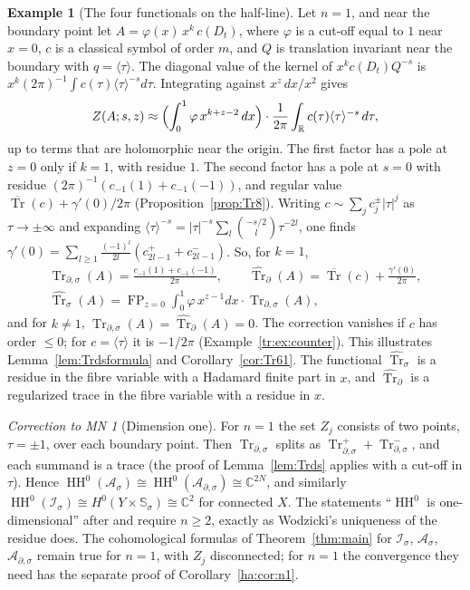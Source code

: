 \documentclass[11pt,oneside,reqno]{article}
\DeclareMathOperator{\HH}{HH}
\DeclareMathOperator{\Tr}{Tr}
\DeclareMathOperator{\FP}{FP}
\newcommand{\C}{\mathbb C}
\newcommand{\R}{\mathbb R}
\newcommand{\Is}{\mathcal I_\sigma}
\newcommand{\As}{\mathcal A_\sigma}
\newcommand{\Ads}{\mathcal A_{\partial,\sigma}}
\newcommand{\Trds}{\Tr_{\partial,\sigma}}
\newcommand{\hTrs}{\widehat{\Tr}_\sigma}
\newcommand{\hTrd}{\widehat{\Tr}_\partial}
\newcommand{\bTr}{\overline{\Tr}}
\newcommand{\Ssig}{\mathbb S_\sigma}
\theoremstyle{plain}
\theoremstyle{definition}
\newtheorem{example}[theorem]{Example}
\theoremstyle{remark}
\newtheorem{correction}[theorem]{Correction to MN}
\begin{document}
\begin{example}[The four functionals on the half-line]\label{ex:four}
Let \(n=1\), and near the boundary point let \(A=\varphi(x)\,x^k\,c(D_t)\),
where \(\varphi\) is a cut-off equal to \(1\) near \(x=0\), \(c\) is a
classical symbol of order \(m\), and \(Q\) is translation invariant near
the boundary with \(q=\langle\tau\rangle\). The diagonal value of the
kernel of \(x^kc(D_t)Q^{-s}\) is \(x^k(2\pi)^{-1}\int c(\tau)\langle\tau
\rangle^{-s}d\tau\). Integrating against \(x^z\,dx/x^2\) gives
\[
 Z(A;s,z)\approx\Bigl(\int_0^1\varphi\,x^{k+z-2}\,dx\Bigr)\cdot
 \frac1{2\pi}\int_{\R}c(\tau)\langle\tau\rangle^{-s}\,d\tau ,
\]
up to terms that are holomorphic near the origin. The first factor has a
pole at \(z=0\) only if \(k=1\), with residue \(1\). The second factor has
a pole at \(s=0\) with residue \((2\pi)^{-1}(c_{-1}(1)+c_{-1}(-1))\), and
regular value \(\bTr(c)+\gamma'(0)/2\pi\) (Proposition~\ref{prop:Tr8}).
Writing \(c\sim\sum_jc^\pm_j|\tau|^j\) as \(\tau\to\pm\infty\) and
expanding \(\langle\tau\rangle^{-s}=|\tau|^{-s}\sum_l\binom{-s/2}{l}
\tau^{-2l}\), one finds \(\gamma'(0)=\sum_{l\ge1}\frac{(-1)^l}{2l}
(c^+_{2l-1}+c^-_{2l-1})\). So, for \(k=1\),
\begin{gather*}
 \Trds(A)=\frac{c_{-1}(1)+c_{-1}(-1)}{2\pi},\qquad
 \hTrd(A)=\bTr(c)+\frac{\gamma'(0)}{2\pi},\\
 \hTrs(A)=\FP_{z=0}\!\int_0^1\varphi\,x^{z-1}dx\cdot\Trds(A),
\end{gather*}
and for \(k\ne1\), \(\Trds(A)=\hTrd(A)=0\). The correction vanishes if
\(c\) has order \(\le0\); for \(c=\langle\tau\rangle\) it is
\(-1/2\pi\) (Example~\ref{tr:ex:counter}). This illustrates
Lemma~\ref{lem:Trdsformula} and Corollary~\ref{cor:Tr61}. The functional
\(\hTrs\) is a residue in the fibre variable with a Hadamard finite part
in \(x\), and \(\hTrd\) is a regularized trace in the fibre variable with
a residue in \(x\).
\end{example}

\begin{correction}[Dimension one]\label{corr:n1}
For \(n=1\) the set \(Z_j\) consists of two points, \(\tau=\pm1\), over
each boundary point. Then \(\Trds\) splits as \(\Trds^++\Trds^-\), and
each summand is a trace (the proof of Lemma~\ref{lem:Trds} applies with a
cut-off in \(\tau\)). Hence \(\HH^0(\As)\cong\HH^0(\Ads)\cong\C^{2N}\),
and similarly \(\HH^0(\Is)\cong H^0(Y\times\Ssig)\cong\C^2\) for connected
\(X\). The statements ``\(\HH^0\) is one-dimensional'' after
\cite[(16)]{MN} and \cite[Lemma~12]{MN} require \(n\ge2\), exactly as
Wodzicki's uniqueness of the residue does. The cohomological formulas of
Theorem~\ref{thm:main} for \(\Is\), \(\As\), \(\Ads\) remain true for
\(n=1\), with \(Z_j\) disconnected; for \(n=1\) the convergence they
need has the separate proof of Corollary~\ref{ha:cor:n1}.
\end{correction}
\end{document}
